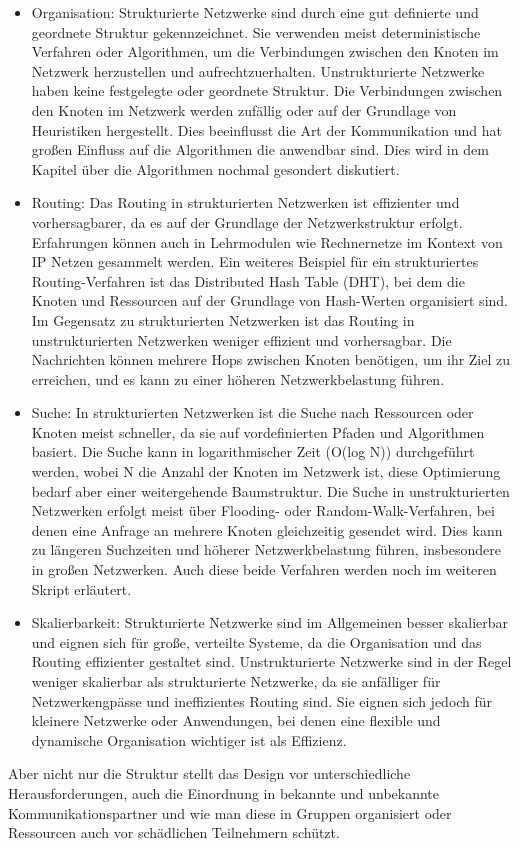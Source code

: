 \documentclass[../vs-script-first-v01.tex]{subfiles}
\begin{document}
\begin{itemize} 
\item Organisation: Strukturierte Netzwerke sind durch eine gut definierte und geordnete Struktur gekennzeichnet. Sie verwenden meist deterministische Verfahren oder Algorithmen, um die Verbindungen zwischen den Knoten im Netzwerk herzustellen und aufrechtzuerhalten. Unstrukturierte Netzwerke haben keine festgelegte oder geordnete Struktur. Die Verbindungen zwischen den Knoten im Netzwerk werden zufällig oder auf der Grundlage von Heuristiken hergestellt. Dies beeinflusst die Art der Kommunikation und hat großen Einfluss auf die Algorithmen die anwendbar sind. Dies wird in dem Kapitel über die Algorithmen nochmal gesondert diskutiert.
\item Routing: Das Routing in strukturierten Netzwerken ist effizienter und vorhersagbarer, da es auf der Grundlage der Netzwerkstruktur erfolgt. Erfahrungen können auch in Lehrmodulen wie Rechnernetze im Kontext von IP Netzen gesammelt werden. Ein weiteres Beispiel für ein strukturiertes Routing-Verfahren ist das Distributed Hash Table (DHT), bei dem die Knoten und Ressourcen auf der Grundlage von Hash-Werten organisiert sind. Im Gegensatz zu strukturierten Netzwerken ist das Routing in unstrukturierten Netzwerken weniger effizient und vorhersagbar. Die Nachrichten können mehrere Hops zwischen Knoten benötigen, um ihr Ziel zu erreichen, und es kann zu einer höheren Netzwerkbelastung führen.
\item Suche: In strukturierten Netzwerken ist die Suche nach Ressourcen oder Knoten meist schneller, da sie auf vordefinierten Pfaden und Algorithmen basiert. Die Suche kann in logarithmischer Zeit (O(log N)) durchgeführt werden, wobei N die Anzahl der Knoten im Netzwerk ist, diese Optimierung bedarf aber einer weitergehende Baumstruktur. Die Suche in unstrukturierten Netzwerken erfolgt meist über Flooding- oder Random-Walk-Verfahren, bei denen eine Anfrage an mehrere Knoten gleichzeitig gesendet wird. Dies kann zu längeren Suchzeiten und höherer Netzwerkbelastung führen, insbesondere in großen Netzwerken. Auch diese beide Verfahren werden noch im weiteren Skript erläutert. 
\item Skalierbarkeit: Strukturierte Netzwerke sind im Allgemeinen besser skalierbar und eignen sich für große, verteilte Systeme, da die Organisation und das Routing effizienter gestaltet sind.
Unstrukturierte Netzwerke sind in der Regel weniger skalierbar als strukturierte Netzwerke, da sie anfälliger für Netzwerkengpässe und ineffizientes Routing sind. Sie eignen sich jedoch für kleinere Netzwerke oder Anwendungen, bei denen eine flexible und dynamische Organisation wichtiger ist als Effizienz.
\end{itemize} 
Aber nicht nur die Struktur stellt das Design vor unterschiedliche Herausforderungen, auch die Einordnung in bekannte und unbekannte Kommunikationspartner und wie man diese in Gruppen organisiert oder Ressourcen auch vor schädlichen Teilnehmern schützt.
\end{document}
